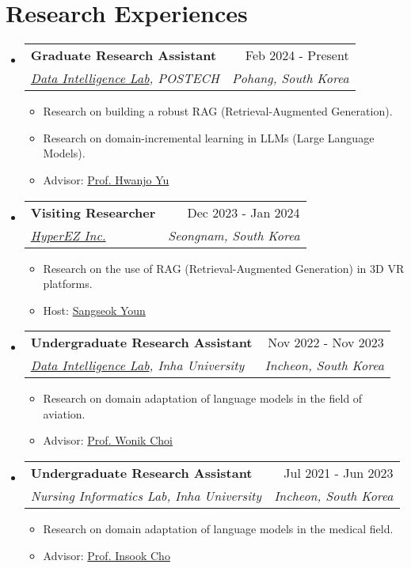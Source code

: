 \documentclass[letterpaper,11pt]{article}
\makeatletter
\newcommand{\resumeSubheading}[4]{
  \vspace{-1pt}\item
    \begin{tabular*}{0.97\textwidth}{l@{\extracolsep{\fill}}r}
      #1 & #2 \\
      \textit{\small#3} & \textit{\small #4} \\
    \end{tabular*}\vspace{-5pt}
}
\makeatother
\begin{document}
    \section{Research Experiences}
    \begin{itemize}[leftmargin=*,label=]

        \resumeSubheading
        {\textbf{Graduate Research Assistant} }{Feb 2024 - Present}
            {\href{https://sites.google.com/view/postechdi/home}{Data Intelligence Lab}, POSTECH}{Pohang, South Korea}
            \begin{itemize}[label=\bullet]
                \item Research on building a robust RAG (Retrieval-Augmented Generation).
                \item Research on domain-incremental learning in LLMs (Large Language Models).
                \item Advisor: \href{https://sites.google.com/view/postechdi/member/faculty}{Prof. Hwanjo Yu}
            \end{itemize}
            
        \resumeSubheading
        {\textbf{Visiting Researcher}}{Dec 2023 - Jan 2024}
            {\href{https://www.hyperez.io/?lang=en}{HyperEZ Inc.}}{Seongnam, South Korea}
            \begin{itemize}[label=\bullet]
                \item{Research on the use of RAG (Retrieval-Augmented Generation) in 3D VR platforms.}
                \item{Host: \href{https://www.linkedin.com/in/amamov/}{Sangseok Youn}}
            \end{itemize}
            
        \resumeSubheading
        {\textbf{Undergraduate Research Assistant} }{Nov 2022 - Nov 2023}
            {\href{http://dilab.inha.ac.kr/}{Data Intelligence Lab}, Inha University}{Incheon, South Korea}
            \begin{itemize}[label=\bullet]
                \item{Research on domain adaptation of language models in the field of aviation.}
                \item{Advisor: \href{http://bit.ly/3zSrQ8F}{Prof. Wonik Choi}}
            \end{itemize}
            
        \resumeSubheading
        {\textbf{Undergraduate Research Assistant}}{Jul 2021 - Jun 2023}
            {Nursing Informatics Lab, Inha University}{Incheon, South Korea}
            \begin{itemize}[label=\bullet]
                \item{Research on domain adaptation of language models in the medical field.}
                \item{Advisor: \href{http://bit.ly/412nYOw}{Prof. Insook Cho}}
            \end{itemize}
            
    \end{itemize}
\end{document}
